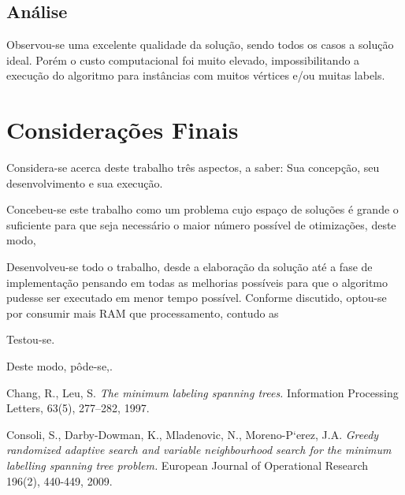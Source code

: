 \documentclass[12pt]{article}
\begin{document}
	\subsection{Análise}\label{sec:analise}

	Observou-se uma excelente qualidade da solução, sendo todos os casos a solução ideal. Porém o custo computacional foi muito elevado, impossibilitando a execução do algoritmo para instâncias com muitos vértices e/ou muitas labels.

\section{Considerações Finais}\label{sec:conclusao}
	
	Considera-se acerca deste trabalho três aspectos, a saber: Sua concepção, seu desenvolvimento e sua execução.

	Concebeu-se este trabalho como um problema cujo espaço de soluções é grande o suficiente para que seja necessário o maior número possível de otimizações, deste modo, 

	Desenvolveu-se todo o trabalho, desde a elaboração da solução até a fase de implementação pensando em todas as melhorias possíveis para que o algoritmo pudesse ser executado em menor tempo possível. Conforme discutido, optou-se por consumir mais RAM que processamento, contudo as 

	Testou-se.

	Deste modo, pôde-se,.




\begin{thebibliography}{}

	Chang, R., Leu, S.
	\newblock \textit{The minimum labeling spanning trees.}
	\newblock Information Processing Letters, 63(5), 277–282, 1997.
	
	Consoli, S., Darby-Dowman, K., Mladenovic, N., Moreno-P`erez, J.A.
	\newblock \textit{Greedy randomized adaptive search and variable neighbourhood search for the minimum labelling spanning tree problem.}
	\newblock European Journal of Operational Research 196(2), 440-449, 2009.

\end{thebibliography}
\end{document}
